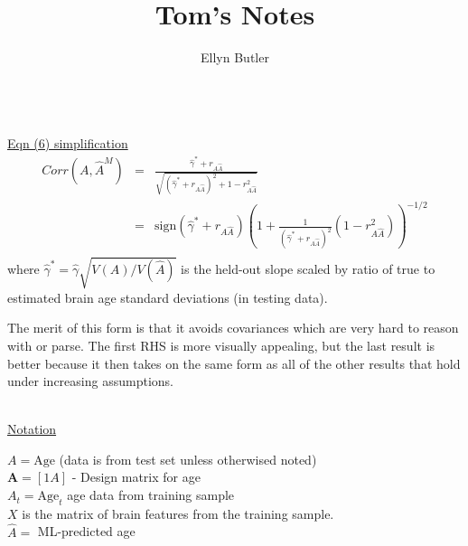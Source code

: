 \documentclass[40pt]{article}
\begin{document}
 
 
\title{Tom's Notes}%
\author{Ellyn Butler} %
 
\maketitle

\hrulefill \\

\underline{Eqn (6) simplification}\\

\begin{eqnarray}
  Corr(A,\hat{A}^M)
  &=&\frac{\hat\gamma^*+r_{A\hat{A}}}{\sqrt{(\hat\gamma^*+r_{A\hat{A}})^2+1-r^2_{A\hat{A}}}}\\
  &=&\mathrm{sign}(\hat\gamma^*+r_{A\hat{A}})
   \left(1 + \frac{1}{(\hat\gamma^*+r_{A\hat{A}})^2}(1-r^2_{A\hat{A}})\right)^{-1/2}\\
\end{eqnarray}
where $\hat\gamma^* = \hat\gamma \sqrt{V(A)/V(\hat{A})}$ is the held-out slope scaled by ratio of true to estimated brain age standard deviations (in testing data).

The merit of this form is that it avoids covariances which are very hard to reason with or parse.  The first RHS is more visually appealing, but the last result is better because it then takes on the same form as all of the other results that hold under increasing assumptions.


\hrulefill \\

\underline{Notation}

$A = \text{Age}$ (data is from test set unless otherwised noted)\\

$\mathbf{A} = [1 A]$ - Design matrix for age\\ 

$A_t = \text{Age}_t$ age data from training sample\\

$X$ is the matrix of brain features from the training sample. \\

$\hat{A} =$ ML-predicted age \\
\end{document}
